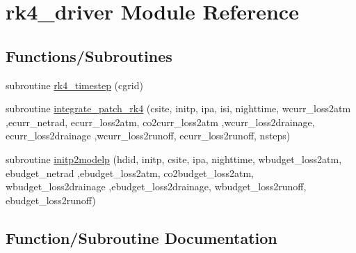 \hypertarget{namespacerk4__driver}{}\section{rk4\+\_\+driver Module Reference}
\label{namespacerk4__driver}
\subsection*{Functions/\+Subroutines}
\begin{DoxyCompactItemize}
\item 
subroutine \hyperlink{namespacerk4__driver_abf8bd20405c7ed6a7bab3bdb18d8de87}{rk4\+\_\+timestep} (cgrid)
\item 
subroutine \hyperlink{namespacerk4__driver_a673e029fcdae29e8babb8af8b47fe412}{integrate\+\_\+patch\+\_\+rk4} (csite, initp, ipa, isi, nighttime, wcurr\+\_\+loss2atm                                                                                                                                                                               ,ecurr\+\_\+netrad, ecurr\+\_\+loss2atm, co2curr\+\_\+loss2atm                                                                                                                                                                               ,wcurr\+\_\+loss2drainage, ecurr\+\_\+loss2drainage                                                                                                                                                                                                   ,wcurr\+\_\+loss2runoff, ecurr\+\_\+loss2runoff, nsteps)
\item 
subroutine \hyperlink{namespacerk4__driver_ade74d4c727e71886d8b603f09b8708d9}{initp2modelp} (hdid, initp, csite, ipa, nighttime, wbudget\+\_\+loss2atm, ebudget\+\_\+netrad                                                                                                       ,ebudget\+\_\+loss2atm, co2budget\+\_\+loss2atm, wbudget\+\_\+loss2drainage                                                                                                                           ,ebudget\+\_\+loss2drainage, wbudget\+\_\+loss2runoff, ebudget\+\_\+loss2runoff)
\end{DoxyCompactItemize}


\subsection{Function/\+Subroutine Documentation}
